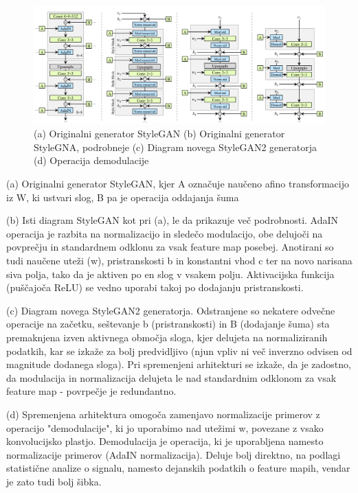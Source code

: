 \documentclass[a4paper,12pt,openright]{book}
\begin{document}
\begin{figure}[htb]
\begin{center}
  \includegraphics[width=1\textwidth]{images/stylegan2_generator.png}
\end{center}
  \caption{(a) Originalni generator StyleGAN (b) Originalni generator StyleGNA, podrobneje (c) Diagram novega StyleGAN2 generatorja (d) Operacija demodulacije}
  \label{Spremembe v arhitekturi StyleGAN2 generatorja}
\end{figure}

(a) Originalni generator StyleGAN, kjer A označuje naučeno
afino transformacijo iz W, ki ustvari slog, B pa je operacija oddajanja šuma 

(b) Isti diagram StyleGAN kot pri (a), le da prikazuje več podrobnosti. AdaIN operacija je razbita na normalizacijo in sledečo modulacijo, obe delujoči na povprečju in standardnem odklonu za vsak feature map posebej. Anotirani so tudi naučene uteži (w), pristranskosti b in konstantni vhod c ter na novo narisana siva polja, tako da je aktiven po en slog v vsakem polju. Aktivacijska funkcija (puščajoča ReLU) se vedno uporabi takoj po dodajanju pristranskosti. 

(c) Diagram novega StyleGAN2 generatorja. Odstranjene so nekatere odvečne operacije na začetku, seštevanje b (pristranskosti) in B (dodajanje šuma) sta premaknjena izven aktivnega območja sloga, kjer delujeta na normaliziranih podatkih, kar se izkaže za bolj predvidljivo (njun vpliv ni več inverzno odvisen od magnitude dodanega sloga). Pri spremenjeni arhitekturi se izkaže, da je zadostno, da modulacija in normalizacija delujeta le nad standardnim odklonom za vsak feature map - povrpečje je redundantno.

(d) Spremenjena arhitektura omogoča zamenjavo normalizacije primerov z operacijo "demodulacije", ki jo uporabimo nad utežimi w, povezane z vsako konvolucijsko plastjo. Demodulacija je operacija, ki je uporabljena namesto normalizacije primerov (AdaIN normalizacija). Deluje bolj direktno, na podlagi statistične analize o signalu, namesto dejanskih podatkih o feature mapih, vendar je zato tudi bolj šibka.
\end{document}
